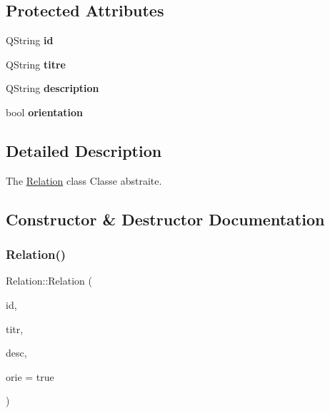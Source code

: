 \subsection*{Protected Attributes}
\begin{DoxyCompactItemize}
\item 
\mbox{\label{class_relation_a8ebffdbe30936c6b9ca55781347b54d5}} 
Q\+String {\bfseries id}
\item 
\mbox{\label{class_relation_a346e9b10df6757dee8dc13cb2f876357}} 
Q\+String {\bfseries titre}
\item 
\mbox{\label{class_relation_a1140829291bd04a86d0b840524692703}} 
Q\+String {\bfseries description}
\item 
\mbox{\label{class_relation_ae95d700e20c27e4123fdae4ef06923e0}} 
bool {\bfseries orientation}
\end{DoxyCompactItemize}


\subsection{Detailed Description}
The \hyperlink{class_relation}{Relation} class Classe abstraite. 

\subsection{Constructor \& Destructor Documentation}
\mbox{\label{class_relation_afded55b4b4ae7b23a86f280ad8b49369}} 
\subsubsection{\texorpdfstring{Relation()}{Relation()}}
{\footnotesize\ttfamily Relation\+::\+Relation (\begin{DoxyParamCaption}\item[{const Q\+String \&}]{id,  }\item[{const Q\+String \&}]{titr,  }\item[{const Q\+String \&}]{desc,  }\item[{bool}]{orie = {\ttfamily true} }\end{DoxyParamCaption})\hspace{0.3cm}{\ttfamily [inline]}}



